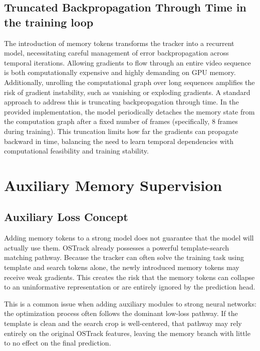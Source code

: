 \documentclass[bachelorthesis]{fer}
\numberwithin{equation}{chapter}
\begin{document}
    \section{Truncated Backpropagation Through Time in the training loop}\label{truncated-backpropagation-through-time-in-the-training-loop}

    The introduction of memory tokens transforms the tracker into a recurrent model, necessitating careful management of
    error backpropagation across temporal iterations. Allowing gradients to flow through an entire video sequence is both
    computationally expensive and highly demanding on GPU memory. Additionally, unrolling the computational graph over long
    sequences amplifies the risk of gradient instability, such as vanishing or exploding gradients. A standard approach to
    address this is truncating backpropagation through time. In the provided implementation, the model periodically
    detaches the memory state from the computation graph after a fixed number of frames (specifically, 8 frames during
    training). This truncation limits how far the gradients can propagate backward in time, balancing the need to learn
    temporal dependencies with computational feasibility and training stability.


    \chapter{Auxiliary Memory Supervision}\label{auxiliary-memory-supervision}


    \section{Auxiliary Loss Concept}\label{auxiliary-loss-concept}

    Adding memory tokens to a strong model does not guarantee that the model will actually use them.
    OSTrack already possesses a powerful template-search matching pathway. Because the tracker can often solve the
    training task using template and search tokens alone, the newly introduced memory tokens may receive
    weak gradients. This creates the risk that the memory tokens can collapse to an uninformative representation
    or are entirely ignored by the prediction head.

    This is a common issue when adding auxiliary modules to strong neural networks: the optimization process often follows the dominant low-loss pathway. If the template is clean and the search crop is well-centered, that pathway may rely entirely on the original OSTrack features, leaving the memory branch with little to no effect on the final prediction.
\end{document}
